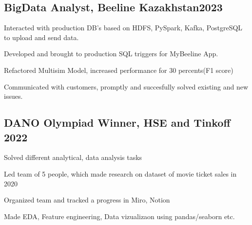 \documentclass[a4paper,12pt]{article}
\begin{document}

\subsection{{BigData Analyst, Beeline Kazakhstan}\hfill 2023}
\begin{zitemize}
\item Interacted with production DB's based on HDFS, PySpark, Kafka, PostgreSQL to upload and send data.
\item Developed and brought to production SQL triggers for MyBeeline App.
\item Refactored  Multisim Model, increased performance for 30 percents(F1 score)
\item Communicated with customers, promptly and succesfully solved existing and new issues.
\end{zitemize}



\vspace*{5pt}
\subsection{{DANO Olympiad Winner, HSE and Tinkoff }\hfill 2022}
\begin{zitemize}
\item Solved different analytical, data analysis tasks
\item Led team of 5 people, which made research on dataset of
movie ticket sales in 2020
\item Organized team and tracked a progress in Miro, Notion
\item Made EDA, Feature engineering, Data vizualizaon using
pandas/seaborn etc.
\end{zitemize}

\end{document}
